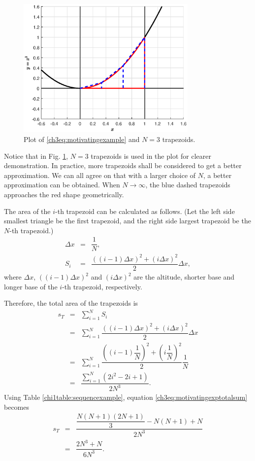 \begin{figure}
\centering
\includegraphics[width=250pt]{chapters/chapter3/figures/motivatingexp.eps}
\caption{Plot of \eqref{ch3eq:motivatingexample} and $N=3$ trapezoids.} \label{ch3fig:motivatingexp}
\end{figure}

Notice that in Fig. \ref{ch3fig:motivatingexp}, $N=3$ trapezoids is used in the plot for clearer demonstration. In practice, more trapezoids shall be considered to get a better approximation. We can all agree on that with a larger choice of $N$, a better approximation can be obtained. When $N \rightarrow \infty$, the blue dashed trapezoids approaches the red shape geometrically.

The area of the $i$-th trapezoid can be calculated as follows. (Let the left side smallest triangle be the first trapezoid, and the right side largest trapezoid be the $N$-th trapezoid.)
\begin{eqnarray}
    \Delta x &=& \dfrac{1}{N}, \nonumber \\
    S_i &=& \dfrac{\left((i-1) \Delta x\right)^2 + \left(i \Delta x\right)^2}{2} \Delta x, \nonumber
\end{eqnarray}
where $\Delta x$, $\left((i-1) \Delta x\right)^2$ and $\left(i \Delta x\right)^2$ are the altitude, shorter base and longer base of the $i$-th trapezoid, respectively.

Therefore, the total area of the trapezoids is
\begin{eqnarray}
   s_{T} &=& \sum_{i=1}^{N}S_i \nonumber \\
    &=& \sum_{i=1}^{N} \dfrac{\left((i-1) \Delta x\right)^2 + \left(i \Delta x\right)^2}{2} \Delta x \nonumber \\
    &=& \sum_{i=1}^{N} \dfrac{\left((i-1) \dfrac{1}{N} \right)^2 + \left(i \dfrac{1}{N} \right)^2}{2} \dfrac{1}{N} \nonumber \\
    &=& \dfrac{\sum_{i=1}^{N}\left(2i^2 - 2i + 1\right)}{2N^3}. \label{ch3eq:motivatingexptotalsum}
\end{eqnarray}
Using Table \ref{chi1table:sequencexample}, equation \eqref{ch3eq:motivatingexptotalsum} becomes
\begin{eqnarray}
   s_{T} &=& \dfrac{\dfrac{N(N+1)(2N+1)}{3} - N(N+1) + N}{2N^3} \nonumber \\
    &=& \dfrac{2N^3 + N}{6N^3}. \label{ch3eq:motivatingexptotalsum2}
\end{eqnarray}

